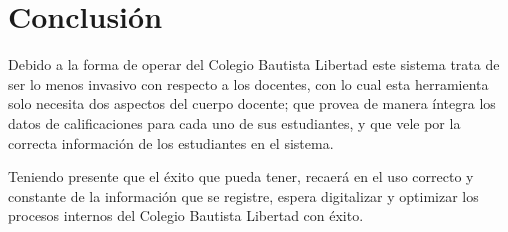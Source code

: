 \documentclass[12pt]{article}
\begin{document}
    \newpage
    \section{Conclusión}

    Debido a la forma de operar del Colegio Bautista Libertad este sistema trata de ser lo menos invasivo con respecto
    a los docentes, con lo cual esta herramienta solo necesita dos aspectos del cuerpo docente; que provea de manera
    íntegra los datos de calificaciones para cada uno de sus estudiantes, y que
    vele por la correcta información de los estudiantes en el sistema.

    Teniendo presente que el éxito que \wsm pueda tener, recaerá en el uso correcto y constante de la información que se
    registre, espera digitalizar y optimizar los procesos internos del Colegio Bautista Libertad con éxito.
\end{document}
